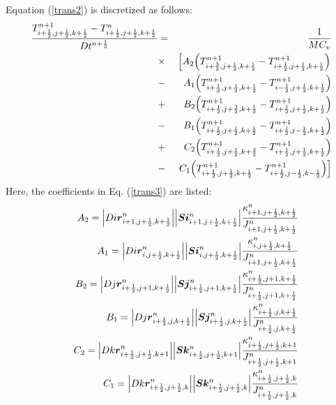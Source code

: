 \begin{enumerate}
Equation (\ref{trans2}) is discretized as follows:
\small
	\begin{eqnarray}\label{trans3}
		\frac{T^{n+1}_{i+\frac{1}{2},j+\frac{1}{2},k+\frac{1}{2}}-T^{n}_{i+\frac{1}{2},j+\frac{1}{2},k+\frac{1}{2}}}{Dt^{n+\frac{1}{2}}}&=&\frac{1}{MC_v}\nonumber\\
		&\times&\left[A_2\Bigl(T^{n+1}_{i+\frac{3}{2},j+\frac{1}{2},k+\frac{1}{2}}-T^{n+1}_{i+\frac{1}{2},j+\frac{1}{2},k+\frac{1}{2}}\Bigr)\right.\nonumber\\
		&-&A_1\Bigl(T^{n+1}_{i+\frac{1}{2},j+\frac{1}{2},k+\frac{1}{2}}-T^{n+1}_{i-\frac{1}{2},j+\frac{1}{2},k+\frac{1}{2}}\Bigr)\nonumber\\
		&+&B_2\Bigl(T^{n+1}_{i+\frac{1}{2},j+\frac{3}{2},k+\frac{1}{2}}-T^{n+1}_{i+\frac{1}{2},j+\frac{1}{2},k+\frac{1}{2}}\Bigr)\nonumber\\
		&-&B_1\Bigl(T^{n+1}_{i+\frac{1}{2},j+\frac{1}{2},k+\frac{1}{2}}-T^{n+1}_{i+\frac{1}{2},j-\frac{1}{2},k+\frac{1}{2}}\Bigr)\nonumber\\
		&+&C_2\Bigl(T^{n+1}_{i+\frac{1}{2},j+\frac{1}{2},k+\frac{3}{2}}-T^{n+1}_{i+\frac{1}{2},j+\frac{1}{2},k+\frac{1}{2}}\Bigr)\nonumber\\
		&-&\left.C_1\Bigl(T^{n+1}_{i+\frac{1}{2},j+\frac{1}{2},k+\frac{1}{2}}-T^{n+1}_{i+\frac{1}{2},j-\frac{1}{2},k-\frac{1}{2}}\Bigr)\right]\nonumber\\
	\end{eqnarray}
\normalsize
Here, the coefficients in Eq. (\ref{trans3}) are listed: 
\small
\begin{eqnarray*}
&&A_2=\Bigl|{Di\bm r}^n_{i+1,j+\frac{1}{2},k+\frac{1}{2}}\Bigr|{\Bigl|\bm{Si}^n_{i+1,j+\frac{1}{2},k+\frac{1}{2}}\Bigr|}\frac{\kappa^n_{i+1,j+\frac{1}{2},k+\frac{1}{2}}}{J^n_{i+1,j+\frac{1}{2},k+\frac{1}{2}}}\\
&&A_1=\Bigl|{Di\bm r}^n_{i,j+\frac{1}{2},k+\frac{1}{2}}\Bigr|{\Bigl|\bm{Si}^n_{i,j+\frac{1}{2},k+\frac{1}{2}}\Bigr|}\frac{\kappa^n_{i,j+\frac{1}{2},k+\frac{1}{2}}}{J^n_{i+1,j+\frac{1}{2},k+\frac{1}{2}}}\\
&&B_2=\Bigl|{Dj\bm r}^n_{i+\frac{1}{2},j+1,k+\frac{1}{2}}\Bigr|{\Bigl|\bm{Sj}^n_{i+\frac{1}{2},j+1,k+\frac{1}{2}}\Bigr|}\frac{\kappa^n_{i+\frac{1}{2},j+1,k+\frac{1}{2}}}{J^n_{i+\frac{1}{2},j+1,k+\frac{1}{2}}}\\
&&B_1=\Bigl|{Dj\bm r}^n_{i+\frac{1}{2},j,k+\frac{1}{2}}\Bigr|{\Bigl|\bm{Sj}^n_{i+\frac{1}{2},j,k+\frac{1}{2}}\Bigr|}\frac{\kappa^n_{i+\frac{1}{2},j,k+\frac{1}{2}}}{J^n_{i+\frac{1}{2},j,k+\frac{1}{2}}}\\
&&C_2=\Bigl|{Dk\bm r}^n_{i+\frac{1}{2},j+\frac{1}{2},k+1}\Bigr|{\Bigl|\bm{Sk}^n_{i+\frac{1}{2},j+\frac{1}{2},k+1}\Bigr|}\frac{\kappa^n_{i+\frac{1}{2},j+\frac{1}{2},k+1}}{J^n_{i+\frac{1}{2},j+\frac{1}{2},k+1}}\\
&&C_1=\Bigl|{Dk\bm r}^n_{i+\frac{1}{2},j+\frac{1}{2},k}\Bigr|{\Bigl|\bm{Sk}^n_{i+\frac{1}{2},j+\frac{1}{2},k}\Bigr|}\frac{\kappa^n_{i+\frac{1}{2},j+\frac{1}{2},k}}{J^n_{i+\frac{1}{2},j+\frac{1}{2},k}}\\
\end{eqnarray*}
\normalsize
	

\end{enumerate}
